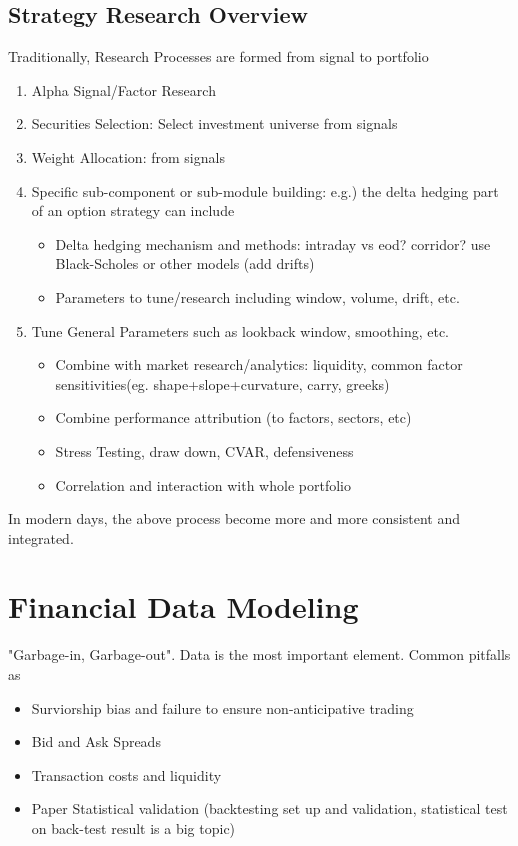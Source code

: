 \documentclass[11pt, openany]{book}              %
\begin{document}
\section{Strategy Research Overview}

Traditionally, Research Processes are formed from signal to portfolio

\begin{enumerate}
	\item Alpha Signal/Factor Research
	\item Securities Selection: Select investment universe from signals
	\item Weight Allocation: from signals
	\item Specific sub-component or sub-module building: e.g.) the delta hedging part of an option strategy can include
		\begin{itemize}
			\item Delta hedging mechanism and methods: intraday vs eod? corridor? use Black-Scholes or other models (add drifts)
			\item Parameters to tune/research including window, volume, drift, etc.
		\end{itemize}
	\item Tune General Parameters such as lookback window, smoothing, etc.
		\begin{itemize}
			\item Combine with market research/analytics: liquidity, common factor sensitivities(eg. shape+slope+curvature, carry, greeks)
			\item Combine performance attribution (to factors, sectors, etc)
			\item Stress Testing, draw down, CVAR, defensiveness
			\item Correlation and interaction with whole portfolio
		\end{itemize}
\end{enumerate}

In modern days, the above process become more and more consistent and integrated.

\chapter{Financial Data Modeling}


"Garbage-in, Garbage-out". Data is the most important element. Common pitfalls as

\begin{itemize}
	\item Surviorship bias and failure to ensure non-anticipative trading
	\item Bid and Ask Spreads
	\item Transaction costs and liquidity
	\item Paper Statistical validation (backtesting set up and validation, statistical test on back-test result is a big topic)
\end{itemize}
\end{document}
